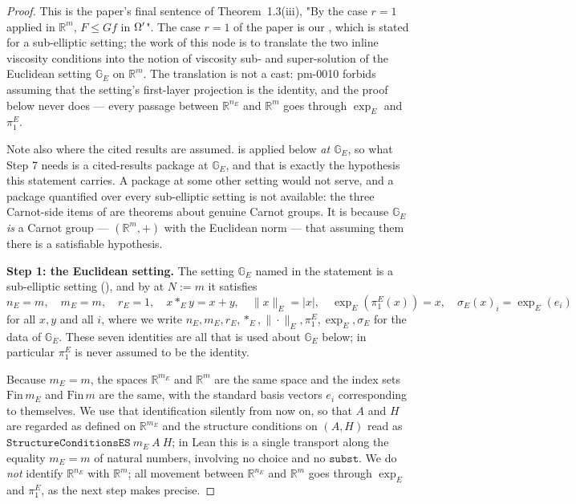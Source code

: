 \begin{proof}
This is the paper's final sentence of Theorem~1.3(iii), "By the case $r=1$ applied in
$\mathbb R^{m}$, $F\le Gf$ in $\Omega'$". The case $r=1$ of the paper is our
, which is stated for a sub-elliptic setting; the work of this
node is to translate the two inline viscosity conditions into the notion of viscosity sub-
and super-solution of the Euclidean setting $\mathbb G_E$ on $\mathbb R^{m}$. The
translation is not a cast: pm-0010 forbids assuming that the setting's first-layer
projection is the identity, and the proof below never does --- every passage between
$\mathbb R^{n_E}$ and $\mathbb R^{m}$ goes through $\exp_E$ and $\pi_1^E$.

Note also where the cited results are assumed.  is applied below
\emph{at $\mathbb G_E$}, so what Step 7 needs is a cited-results package at $\mathbb G_E$,
and that is exactly the hypothesis this statement carries. A package at some other setting
would not serve, and a package quantified over every sub-elliptic setting is not available:
the three Carnot-side items of  are theorems about genuine Carnot
groups. It is because $\mathbb G_E$ \emph{is} a Carnot group --- $(\mathbb R^{m},+)$ with the
Euclidean norm --- that assuming them there is a satisfiable hypothesis.

\medskip\noindent\textbf{Step 1: the Euclidean setting.} The setting $\mathbb G_E$ named in
the statement is a sub-elliptic setting (), and by
 at $N:=m$ it satisfies
\[
 n_E=m,\quad m_E=m,\quad r_E=1,\quad x*_Ey=x+y,\quad \|x\|_E=|x|,\quad
 \exp_E(\pi_1^E(x))=x,\quad \sigma_E(x)_i=\exp_E(e_i) \tag{1}
\]
for all $x,y$ and all $i$, where we write $n_E,m_E,r_E,*_E,\|\cdot\|_E,\pi_1^E,\exp_E,\sigma_E$
for the data of $\mathbb G_E$. These seven identities are all that is used about
$\mathbb G_E$ below; in particular $\pi_1^E$ is never assumed to be the identity.

Because $m_E=m$, the spaces $\mathbb R^{m_E}$ and $\mathbb R^{m}$ are the same space and the
index sets $\mathrm{Fin}\,m_E$ and $\mathrm{Fin}\,m$ are the same, with the standard basis
vectors $e_i$ corresponding to themselves. We use that identification silently from now on,
so that $A$ and $H$ are regarded as defined on $\mathbb R^{m_E}$ and the structure conditions
on $(A,H)$ read as $\mathtt{StructureConditionsES}\ m_E\ A\ H$; in Lean this is a single
transport along the equality $m_E=m$ of natural numbers, involving no choice and no
$\mathtt{subst}$. We do \emph{not} identify $\mathbb R^{n_E}$ with $\mathbb R^{m}$; all
movement between $\mathbb R^{n_E}$ and $\mathbb R^{m}$ goes through $\exp_E$ and $\pi_1^E$,
as the next step makes precise.


\end{proof}
